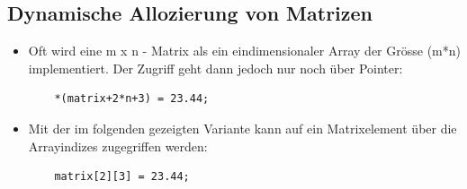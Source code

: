 \subsection{Dynamische Allozierung von Matrizen}
\label{sec:Dynamische Allozierung von Matrizen}
\begin{itemize}
	\item Oft wird eine m x n - Matrix als ein eindimensionaler Array der Grösse (m*n) implementiert. Der Zugriff geht dann jedoch nur noch über Pointer:
	\noindent
	\begin{minipage}{\linewidth}
	\begin{lstlisting}
	*(matrix+2*n+3) = 23.44;
	\end{lstlisting}
	\end{minipage}
	\item Mit der im folgenden gezeigten Variante kann auf ein Matrixelement über die Arrayindizes zugegriffen werden:
	\begin{minipage}{\linewidth}
	\begin{lstlisting}
	matrix[2][3] = 23.44;
	\end{lstlisting}
	\end{minipage}
\end{itemize}

